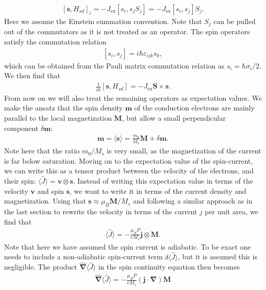 \begin{align}
\left[\mathbold{s}, H_{sd}\right]_i = -J_{\textrm{ex}} \left[s_i, s_j S_j\right] = -J_{\textrm{ex}}\left[s_i, s_j\right] S_j.
\end{align}
Here we assume the Einstein summation convention. Note that $S_j$ can be pulled out of the commutators as it is not treated as an operator. The spin operators satisfy the commutation relation
\begin{align}
\left[s_i, s_j\right] = i\hbar\varepsilon_{ijk}s_k,
\end{align}
which can be obtained from the Pauli matrix commutation relation as $s_i = \hbar \sigma_i/2$. We then find that
\begin{align}
\frac{1}{i\hbar}\left[\mathbold{s}, H_{sd}\right] = -J_{\textrm{ex}}\mathbold{S}\times\mathbold{s}.
\end{align}
From now on we will also treat the remaining operators as expectation values. We make the ansatz that the spin density $\mathbold{m}$ of the conduction electrons are mainly parallel to the local magnetization $\mathbold{M}$, but allow a small perpendicular component $\delta\mathbold{m}$:
\begin{align}
    \mathbold{m} = \langle\mathbold{s}\rangle = \frac{m_0}{M_s} \mathbold{M} + \delta\mathbold{m}.
\end{align}
Note here that the ratio $m_0/M_s$ is very small, as the magnetization of the current is far below saturation. Moving on to the expectation value of the spin-current, we can write this as a tensor product between the velocity of the electrons, and their spin: $\langle\hat{J}\rangle = \mathbold{v}\otimes\mathbold{s}$. Instead of writing this expectation value in terms of the velocity $\mathbold{v}$ and spin $\mathbold{s}$, we want to write it in terms of the current density and magnetization. Using that $\mathbold{s} \approx \mu_B\mathbold{M}/M_s$ and following a similar approach as in the last section to rewrite the velocity in terms of the current $j$ per unit area, we find that
\begin{align}
\langle\hat{J}\rangle = -\frac{\mu_B P}{eM_s} \mathbold{j}\otimes\mathbold{M}.
\end{align}
Note that here we have assumed the spin current is adiabatic. To be exact one needs to include a non-adiabatic spin-current term $\delta\langle\hat{J}\rangle$, but it is assumed this is negligible. The product $\mathbold{\hat{\nabla}}\langle\hat{J}\rangle$ in the spin continuity equation then becomes
\begin{align}
\mathbold{\hat{\nabla}}\langle\hat{J}\rangle = -\frac{\mu_B P}{e M_s}\left(\mathbold{j}\cdot\mathbold{\nabla}\right)\mathbold{M}
\end{align}
